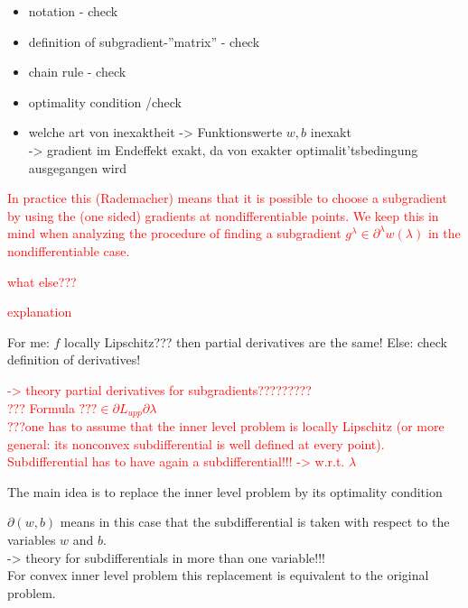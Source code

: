 \begin{itemize}
	\item notation - check
	\item definition of subgradient-''matrix'' - check
	\item chain rule - check
	\item optimality condition /check
\end{itemize}

\begin{itemize}
	\item welche art von inexaktheit -> Funktionswerte \(w,b\) inexakt\\
	-> gradient im Endeffekt exakt, da von exakter optimalit'tsbedingung ausgegangen wird
\end{itemize}


\textcolor{red}{In practice this (Rademacher) means that it is possible to choose a subgradient by using the (one sided) gradients at nondifferentiable points.
We keep this in mind when analyzing the procedure of finding a subgradient \( g^{\lambda} \in \partial^{\lambda} w(\lambda)\) in the nondifferentiable case.}

\textcolor{red}{what else???}

\textcolor{red}{explanation}








For me: \(f\) locally Lipschitz??? then partial derivatives are the same! Else: check definition of derivatives!

\textcolor{red}{-> theory partial derivatives for subgradients????????? \\
??? Formula \(??? \in \partial L_{upp}{\partial \lambda}\) \\
???one has to assume that the inner level problem is locally Lipschitz (or more general: its nonconvex subdifferential is well defined at every point). \\
Subdifferential has to have again a subdifferential!!! -> w.r.t. \(\lambda\)}


The main idea is to replace the inner level problem by its optimality condition


\(\partial(w,b)\) means in this case that the subdifferential is taken with respect to the variables \(w\) and \(b\). \\
-> theory for subdifferentials in more than one variable!!! \\

For convex inner level problem this replacement is equivalent to the original problem.

